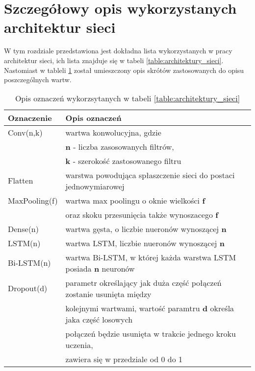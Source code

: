 \newpage %
\section{Szczegółowy opis wykorzystanych architektur sieci}

W tym rozdziale przedstawiona jest dokładna lista wykorzystanych w pracy architektur sieci, ich lista znajduje się w tabeli \ref{table:architektury_sieci}. Nastomiast w tableli \ref{tab:oznaczenia_warstw} został umieszczony opis skrótów zastosowanych do opisu poszczególnych wartw.



\begin{table}[!h]  \centering
    \caption{Opis oznaczeń wykorzsytanych w tabeli \ref{table:architektury_sieci}}
    \label{tab:oznaczenia_warstw}
    \begin{tabular} {| l | l |} \hline
        Oznaczenie    & Opis oznaczeń                                                          \\ \hline
        Conv(n,k)     & wartwa konwolucyjna, gdzie                                             \\ & \textbf{n} - liczba zasosowanych filtrów, \\ & \textbf{k} - szerokość zastosowanego filtru \\ \hline
        Flatten       & warstwa powodująca spłaszczenie sieci do postaci jednowymiarowej       \\ \hline
        MaxPooling(f) & wartwa max poolingu o oknie wielkości \textbf{f}                                \\ & oraz skoku przesunięcia także wynoszacego \textbf{f}   \\ \hline
        Dense(n)      & wartwa gęsta, o liczbie nueronów wynoszącej \textbf{n}                 \\ \hline
        LSTM(n)       & wartwa LSTM, liczbie nueronów wynoszącej \textbf{n}                            \\ \hline
        Bi-LSTM(n)    & wartwa Bi-LSTM, w której każda warstwa LSTM posiada \textbf{n} neuronów         \\ \hline
        Dropout(d)    & parametr określający jak duża część połączeń zostanie  usunięta między \\ & kolejnymi wartwami, wartość paramtru \textbf{d} określa jaka część losowych \\ & połączeń będzie usunięta w trakcie jednego kroku uczenia, \\ & zawiera się w przedziale od 0 do 1                                                             \\ \hline
    \end{tabular}
\end{table}

